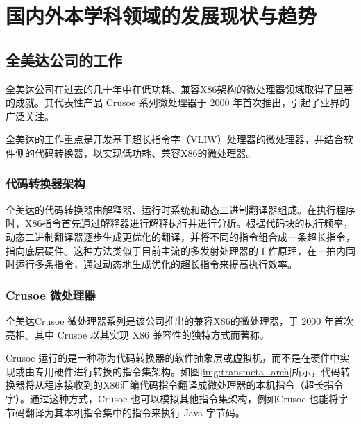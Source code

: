 \documentclass{Style/ucasproposal}%
\begin{document}

\section{国内外本学科领域的发展现状与趋势}

\subsection{全美达公司的工作}

全美达公司在过去的几十年中在低功耗、兼容X86架构的微处理器领域取得了显著的成就。其代表性产品 Crusoe 系列微处理器于 2000 年首次推出，引起了业界的广泛关注。

全美达的工作重点是开发基于超长指令字（VLIW）处理器的微处理器，并结合软件侧的代码转换器，以实现低功耗、兼容X86的微处理器。

\subsubsection{代码转换器架构}

全美达的代码转换器\cite{dehnertTransmetaCodeMorphing2003}由解释器、运行时系统和动态二进制翻译器组成。在执行程序时，X86指令首先通过解释器进行解释执行并进行分析。根据代码块的执行频率，动态二进制翻译器逐步生成更优化的翻译，并将不同的指令组合成一条超长指令，指向底层硬件。这种方法类似于目前主流的多发射处理器的工作原理，在一拍内同时运行多条指令，通过动态地生成优化的超长指令来提高执行效率。

\subsubsection{Crusoe 微处理器}

全美达Crusoe 微处理器系列是该公司推出的兼容X86的微处理器，于 2000 年首次亮相。其中 Crusoe 以其实现 X86 兼容性的独特方式而著称。

Crusoe 运行的是一种称为代码转换器的软件抽象层或虚拟机，而不是在硬件中实现或由专用硬件进行转换的指令集架构。如图\ref{img:transmeta_arch}所示，代码转换器将从程序接收到的X86汇编代码指令翻译成微处理器的本机指令（超长指令字）。通过这种方式，Crusoe 也可以模拟其他指令集架构，例如Crusoe 也能将字节码翻译为其本机指令集中的指令来执行 Java 字节码。
\end{document}
